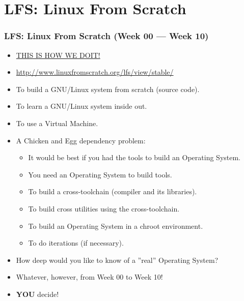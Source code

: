 \documentclass[xcolor=table, notheorems, hyperref={pdfpagelabels=false}]{beamer}
\begin{document}
\section{LFS: Linux From Scratch}
\begin{frame}
\frametitle{LFS: Linux From Scratch (Week 00 --- Week 10)}
\begin{itemize}
\item \href{https://youtu.be/jEoM3qan9Gs}{THIS IS HOW WE DOIT!}
\item \url{http://www.linuxfromscratch.org/lfs/view/stable/}
\item To build a GNU/Linux system from scratch (source code).
\item To learn a GNU/Linux system inside out.
\item To use a Virtual Machine.
\item A Chicken and Egg dependency problem:
\begin{itemize}
\item It would be best if you had the tools to build an Operating System.
\item You need an Operating System to build tools.
\item To build a cross-toolchain (compiler and its libraries).
\item To build cross utilities using the cross-toolchain.
\item To build an Operating System in a chroot environment.
\item To do iterations (if necessary).
\end{itemize}
\item How deep would you like to know of a ''real'' Operating System?
\item Whatever, however, from Week 00 to Week 10!
\item \textbf{YOU} decide!
\end{itemize}
\end{frame}

\end{document}
